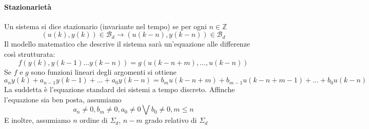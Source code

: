 \documentclass[11pt]{article}
\begin{document}
\paragraph{Stazionarietà}
Un sistema si dice stazionario (invariante nel tempo) se per ogni $n\in \mathbb{Z}$
\begin{displaymath}
    (u(k),y(k)) \in \mathcal{B}_d \rightarrow (u(k-n), y(k-n)) \in \mathcal{B}_d
\end{displaymath}
Il modello matematico che descrive il sistema sarà un'equazione alle differenze così strutturata:
\begin{displaymath}
    f(y(k), y(k-1)...y(k-n)) = g(u(k-n+m),\dots,u(k-n))
\end{displaymath}
Se $f$ e $g$ sono funzioni lineari degli argomenti si ottiene
\begin{displaymath}
    a_ny(k)+a_{n-1}y(k-1)+...+a_0y(k-n) = b_mu(k-n+m)+b_{m-1}u(k-n+m-1)+\dots+b_0u(k-n)
\end{displaymath}
La suddetta è l'equazione standard dei sistemi a tempo discreto.
Affinche l'equazione sia ben posta, assumiamo
\begin{displaymath}
    a_n \neq 0, b_m \neq 0, a_0\neq 0 \bigvee b_0 \neq 0, m \le n
\end{displaymath}
E inoltre, assumiamo $n$ ordine di $\Sigma_d$, $n-m$ grado relativo di $\Sigma_d$
\end{document}
